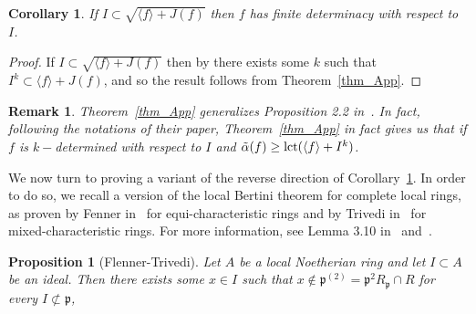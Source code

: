 \documentclass{article}
\newtheorem{proposition}[theorem]{Proposition}
\newtheorem{remark}[theorem]{Remark}
\newtheorem{corollary}[theorem]{Corollary}
\numberwithin{theorem}{section}
\begin{document}
\begin{corollary}\label{cor:sqrtI}
    If $I \subset \sqrt{\langle f \rangle + J(f)}$ then $f$ has finite determinacy with respect to $I$. 
\end{corollary}

\begin{proof}
    If $I \subset \sqrt{\langle f \rangle + J(f)}$ then by there exists some $k$ such that $I^k \subset \langle f \rangle + J(f)$, and so the result follows from Theorem~\ref{thm_App}.
\end{proof}

\begin{remark}
    \textup{Theorem~\ref{thm_App} generalizes Proposition 2.2 in~\cite{cluckers2022log}. In fact, following the notations of their paper, Theorem~\ref{thm_App} in fact gives us that if $f$ is $k-$determined with respect to $I$ and $\tilde{\alpha}(f) \geq \textup{lct}(\langle f \rangle+ I^{k})$.   }
\end{remark}

We now turn to proving a variant of the reverse direction of Corollary~\ref{cor:sqrtI}. In order to do so, we recall a version of the local Bertini theorem for complete local rings, as proven by Fenner in~\cite{flenner1977satze} for equi-characteristic rings and by Trivedi in~\cite{vijaylaxmi1994local} for mixed-characteristic rings. For more information, see Lemma 3.10 in~\cite{baily2026extremal} and~\cite{ochiai2015bertini}.

\begin{proposition}[Flenner-Trivedi]\label{prop:bertini-schmertini}
    Let $A$ be a  local Noetherian ring and let $I \subset A$ be an ideal. Then there exists some $x \in I$ such that $x \notin \mathfrak{p}^{(2)}= \mathfrak{p}^2 R_{\mathfrak{p}} \cap R$ for every $I \not\subset \mathfrak{p}$,  
\end{proposition}
\end{document}
